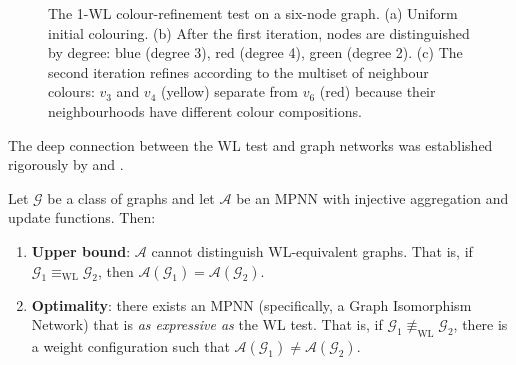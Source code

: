 \begin{figure}[h]
\caption[Weisfeiler--Leman colour refinement]{The 1-WL colour-refinement test on
a six-node graph. (a) Uniform initial colouring. (b) After the first iteration,
nodes are distinguished by degree: blue (degree 3), red (degree 4), green
(degree 2). (c) The second iteration refines according to the multiset of
neighbour colours: $v_3$ and $v_4$ (yellow) separate from $v_6$ (red) because
their neighbourhoods have different colour compositions.}
\label{fig:priors:wl}
\end{figure}

The deep connection between the WL test and graph networks was established
rigorously by \citet{xu2019how} and \citet{morris2019weisfeiler}.

\begin{theorem}
\label{thm:priors:wl-mpnn}
Let $\mathcal{G}$ be a class of graphs and let $\mathcal{A}$ be an MPNN with
injective aggregation and update functions. Then:
\begin{enumerate}
\item \textbf{Upper bound}: $\mathcal{A}$ cannot distinguish WL-equivalent
graphs. That is, if $\mathcal{G}_1 \equiv_{\mathrm{WL}} \mathcal{G}_2$, then
$\mathcal{A}(\mathcal{G}_1) = \mathcal{A}(\mathcal{G}_2)$.
\item \textbf{Optimality}: there exists an MPNN (specifically, a Graph
Isomorphism Network) that is \emph{as expressive as} the WL test. That is, if
$\mathcal{G}_1 \not\equiv_{\mathrm{WL}} \mathcal{G}_2$, there is a weight
configuration such that
$\mathcal{A}(\mathcal{G}_1) \neq \mathcal{A}(\mathcal{G}_2)$.
\end{enumerate}
\end{theorem}

